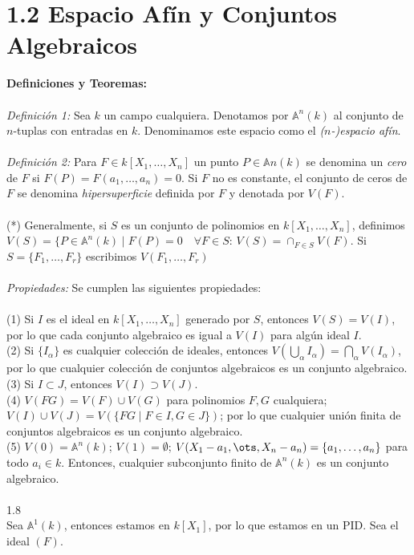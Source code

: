 \documentclass{article}
\newcommand{\A}{\mathbb{A}}
\begin{document}
\section*{1.2 Espacio Afín y Conjuntos Algebraicos}
\textbf{Definiciones y Teoremas:}
\\
\\
\textit{Definición 1:} Sea $k$ un campo cualquiera. Denotamos por $\A^{n}(k)$ al conjunto de $n$-tuplas con entradas en $k$. Denominamos este espacio como el \textit{($n$-)espacio afín}.
\\
\\
\textit{Definición 2:} Para $F \in k[X_1 , \dots, X_n]$ un punto $P \in \A{n}(k)$ se denomina un \textit{cero} de $F$ si $F(P)=F(a_1 , \dots , a_n)=0$. Si $F$ no es constante, el conjunto de ceros de $F$ se denomina \textit{hipersuperficie} definida por $F$ y denotada por $V(F)$.
\\
\\
(*) Generalmente, si $S$ es  un conjunto de polinomios en $k[X_1 , \dots , X_n]$, definimos $V(S)= \{P \in \A^{n}(k) \mid F(P)=0 \quad \forall F \in S$: $V(S)= \cap_{F \in S} V(F)$. Si $S= \{F_1, \dots, F_r \}$ escribimos $V(F_1 , \dots, F_r)$
\\
\\
\textit{Propiedades:} Se cumplen las siguientes propiedades:
\\
\\
(1) Si $I$ es el ideal en $k[X_1, \dots, X_n]$ generado por $S$, entonces $V(S)=V(I)$, por lo que cada conjunto algebraico es igual a $V(I)$ para algún ideal $I$.
\\
(2) Si $\{I_{\alpha} \}$ es cualquier colección de ideales, entonces $V(\bigcup_{\alpha} I_{\alpha})= \bigcap_{\alpha} V(I_{\alpha})$, por lo que cualquier colección de conjuntos algebraicos es un conjunto algebraico.
\\
(3) Si $I \subset J$, entonces $V(I) \supset V(J)$.
\\
(4) $V(FG)=V(F) \cup V(G)$ para polinomios $F,G$ cualquiera; $V(I) \cup V(J)=V( \{FG \mid F \in I, G \in J \})$; por lo que cualquier unión finita de conjuntos algebraicos es un conjunto algebraico.
\\
(5) $V(0)=\A^{n}(k)$; $V(1)=\emptyset$; $V(X_1 - a_1, \ots, X_n -a_n)=\{a_1, \dots,a_n \}$ para todo $a_i \in k$. Entonces, cualquier subconjunto finito de $\A^{n}(k)$ es un conjunto algebraico.
\\
\\
1.8
\\
Sea $\mathbb{A}^{1}(k)$, entonces estamos en $k[X_1]$, por lo que estamos en un PID. Sea el ideal $(F)$.
\end{document}
